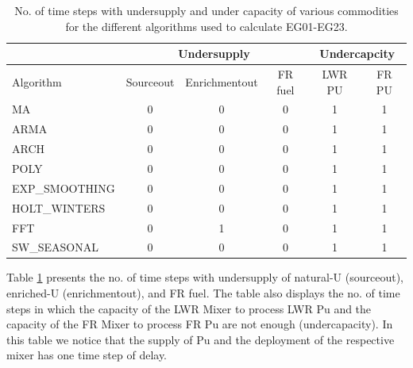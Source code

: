 \documentclass[11pt,letterpaper]{article}
\begin{document}
\begin{table}[!h]
	\centering
	\caption {No. of time steps with undersupply and under capacity of various commodities for the different algorithms used to calculate EG01-EG23.}
	\label{tab:23-commod}
	\begin{tabular}{|l|c|c|c|c|c|}
		\hline
		& \multicolumn{3}{c|}{Undersupply} & \multicolumn{2}{c|}{Undercapcity} \\ \hline
		Algorithm & Sourceout & Enrichmentout & FR fuel & LWR PU & FR PU \\ \hline
		MA        & 0 & 0 & 0 & 1 & 1 \\ \hline
		ARMA      & 0 & 0 & 0 & 1 & 1 \\ \hline
		ARCH      & 0 & 0 & 0 & 1 & 1 \\ \hline
		POLY      & 0 & 0 & 0 & 1 & 1 \\ \hline
		EXP\_SMOOTHING & 0 & 0 & 0 & 1 & 1 \\ \hline
		HOLT\_WINTERS  & 0 & 0 & 0 & 1 & 1 \\ \hline
		FFT       & 0 & 1 & 0 & 1 & 1 \\ \hline
		SW\_SEASONAL  & 0 & 0 & 0 & 1 & 1 \\ \hline
	\end{tabular}
\end{table}

Table \ref{tab:23-commod} presents the no. of time steps with undersupply of natural-U (sourceout), enriched-U (enrichmentout), and FR fuel. The table also displays the no. of time steps in which the capacity of the LWR Mixer to process LWR Pu and the capacity of the FR Mixer to process FR Pu are not enough (undercapacity). In this table we notice that the supply of Pu and the deployment of the respective mixer has one time step of delay.
\end{document}
